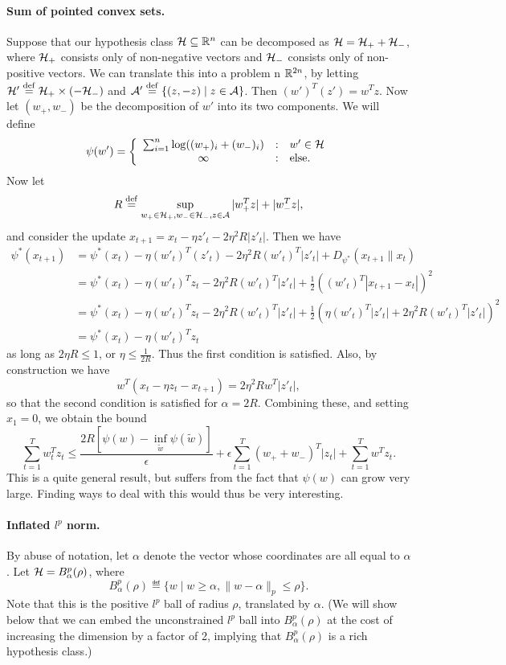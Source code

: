 \documentclass[11pt]{article}
\begin{document}
\paragraph{Sum of pointed convex sets.} Suppose that our hypothesis class 
$\mathcal{H} \subseteq \mathbb{R}^n$ can be decomposed as $\mathcal{H} = \mathcal{H}_+ + \mathcal{H}_-$, where $\mathcal{H}_+$ consists 
only of non-negative vectors and $\mathcal{H}_-$ consists only of non-positive vectors. 
We can translate this into a problem n $\mathbb{R}^{2n}$, by letting $\mathcal{H}' \stackrel{\mathrm{def}}{=} \mathcal{H}_+ \times (-\mathcal{H}_-)$ 
and $\mathcal{A}' \stackrel{\mathrm{def}}{=} \{(z, -z) \mid z \in \mathcal{A}\}$. Then $(w')^T(z') = w^Tz$. Now 
let $(w_+, w_-)$ be the decomposition of $w'$ into its two components. We will 
define
\[ \psi(w') = \left\{ \begin{array}{ccl} \sum_{i=1}^n \log((w_+)_i + (w_-)_i) & : & w' \in \mathcal{H} \\ \infty & : & \mathrm{else}. \end{array} \right. \]
Now let 
\[ R \stackrel{\mathrm{def}}{=} \sup\limits_{w_+ \in \mathcal{H}_+, w_- \in \mathcal{H}_-, z \in \mathcal{A}}  |w_+^Tz| + |w_-^Tz|, \]
and consider the update $x_{t+1} = x_t - \eta z'_t - 2\eta^2 R |z'_t|$. Then we have
\begin{align*}
\psi^*(x_{t+1}) &= \psi^*(x_t) - \eta (w'_t)^T(z'_t) - 2\eta^2R (w'_t)^T|z'_t| + D_{\psi^*}(x_{t+1} \| x_t) \\
 &= \psi^*(x_t) - \eta (w'_t)^Tz_t - 2\eta^2R (w'_t)^T|z'_t| + \frac{1}{2}((w'_t)^T|x_{t+1}-x_t|)^2 \\
 &= \psi^*(x_t) - \eta (w'_t)^Tz_t - 2\eta^2R (w'_t)^T|z'_t| + \frac{1}{2}(\eta (w'_t)^T|z'_t| + 2\eta^2R (w'_t)^T|z'_t|)^2 \\
 &= \psi^*(x_t) - \eta (w'_t)^Tz_t
\end{align*}
as long as $2\eta R \leq 1$, or $\eta \leq \frac{1}{2R}$. Thus the first condition is 
satisfied. Also, by construction we have 
\[ w^T(x_t - \eta z_t - x_{t+1}) = 2\eta^2 R w^T|z'_t|, \]
so that the second condition is satisfied for $\alpha = 2R$. Combining these, and 
setting $x_1 = 0$, we obtain the bound
\[ \sum_{t=1}^T w_t^Tz_t \leq \frac{2R[\psi(w) - \inf_{\tilde{w}} \psi(\tilde{w})]}{\epsilon} + \epsilon \sum_{t=1}^T (w_+ + w_-)^T|z_t| + \sum_{t=1}^T w^Tz_t. \]
This is a quite general result, but suffers from the fact that $\psi(w)$ can grow very large. 
Finding ways to deal with this would thus be very interesting.

\paragraph{Inflated $l^p$ norm.} By abuse of notation, let $\alpha$ denote the vector 
whose coordinates are all equal to $\alpha$. Let $\mathcal{H} = B_{\alpha}^p(\rho)$, where 
\[ B_{\alpha}^p(\rho) \eqdef \{w \mid w \geq \alpha, \|w-\alpha\|_p \leq \rho \}. \]
Note that this is the positive $l^p$ ball of radius $\rho$, translated by $\alpha$. 
(We will show below that we can embed the unconstrained $l^p$ ball into $B_{\alpha}^p(\rho)$ 
at the cost of increasing the dimension by a factor of 2, implying that 
$B_{\alpha}^p(\rho)$ is a rich hypothesis class.) 
\end{document}
